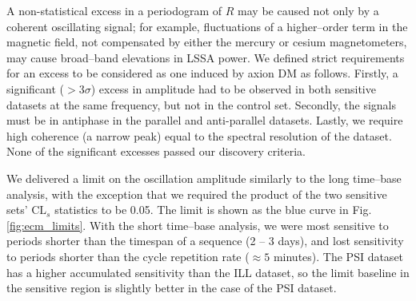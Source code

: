 A non-statistical excess in a periodogram of $R$ may be caused not only by a coherent oscillating signal;
for example, fluctuations of a higher--order term in the magnetic field, not compensated by either the mercury or cesium magnetometers, may cause broad--band elevations in LSSA power.
We defined strict requirements for an excess to be considered as one induced by axion DM as follows.
Firstly, a significant ($>3\sigma$) excess in amplitude had to be observed in both sensitive datasets at the same frequency, but not in the control set. Secondly, the signals must be in antiphase in the parallel and anti-parallel datasets. Lastly, we require high coherence (a narrow peak) equal to the spectral resolution of the dataset. None of the significant excesses passed our discovery criteria.

We delivered a limit on the oscillation amplitude similarly to the long time--base analysis, with the exception that we required the product of the two sensitive sets' $\mathrm{CL}_s$ statistics to be 0.05.
The limit is shown as the blue curve in Fig.\,\ref{fig:ecm_limits}.
With the short time--base analysis, we were most sensitive to periods shorter than the timespan of a sequence (2 -- 3 days), and lost sensitivity to periods shorter than the cycle repetition rate ($\approx 5$ minutes).
The PSI dataset has a higher accumulated sensitivity than the ILL dataset, so the limit baseline in the sensitive region is slightly better in the case of the PSI dataset.

